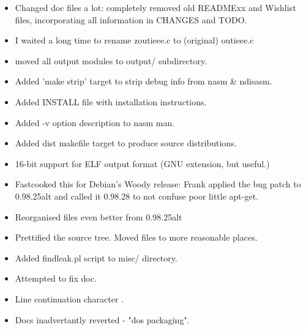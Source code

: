 \begin{itemize}
    \item{Changed doc files a lot: completely removed old READMExx and
        Wishlist files, incorporating all information in CHANGES and TODO.}
    \item{I waited a long time to rename zoutieee.c to (original) outieee.c}
    \item{moved all output modules to output/ subdirectory.}
    \item{Added 'make strip' target to strip debug info from nasm \& ndisasm.}
    \item{Added INSTALL file with installation instructions.}
    \item{Added -v option description to nasm man.}
    \item{Added dist makefile target to produce source distributions.}
    \item{16-bit support for ELF output format (GNU extension, but useful.)}
\end{itemize}



\begin{itemize}
    \item{Fastcooked this for Debian's Woody release:
        Frank applied the  bug patch to 0.98.25alt
        and called it 0.98.28 to not confuse poor little apt-get.}
\end{itemize}


\begin{itemize}
    \item{Reorganised files even better from 0.98.25alt}
\end{itemize}



\begin{itemize}
    \item{Prettified the source tree. Moved files to more reasonable places.}
    \item{Added findleak.pl script to misc/ directory.}
    \item{Attempted to fix doc.}
\end{itemize}


\begin{itemize}
    \item{Line continuation character \code{\\}.}
    \item{Docs inadvertantly reverted - "dos packaging".}
\end{itemize}


